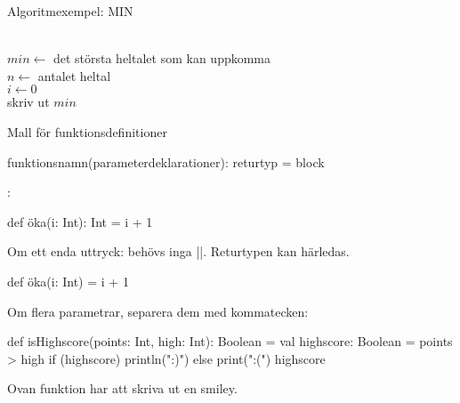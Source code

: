 \begin{Slide}{Algoritmexempel: MIN}
\begin{algorithm}[H]

 ~\\
 $min \leftarrow$ det största heltalet som kan uppkomma  \\
 $n \leftarrow $ antalet heltal \\
 $i \leftarrow 0$ \\
 skriv ut $min$
\end{algorithm}
\end{Slide}



\begin{Slide}{Mall för funktionsdefinitioner}

 funktionsnamn(parameterdeklarationer): returtyp = block

\pause\vspace{0.5em}:

\begin{Code}[basicstyle=\ttfamily\fontsize{9}{11}\selectfont]
def öka(i: Int): Int = { i + 1 }
\end{Code}
\pause Om ett enda uttryck: behövs inga \code|{}|. Returtypen kan härledas.
\begin{Code}[basicstyle=\ttfamily\fontsize{9}{11}\selectfont]
def öka(i: Int) = i + 1
\end{Code}
\pause Om flera parametrar, separera dem med kommatecken:
\begin{Code}[basicstyle=\ttfamily\fontsize{9}{11}\selectfont]
def isHighscore(points: Int, high: Int): Boolean = {
  val highscore: Boolean = points > high
  if (highscore) println(":)") else print(":(")
  highscore
}
\end{Code}
\pause Ovan funktion har  att skriva ut en smiley.
\end{Slide}

